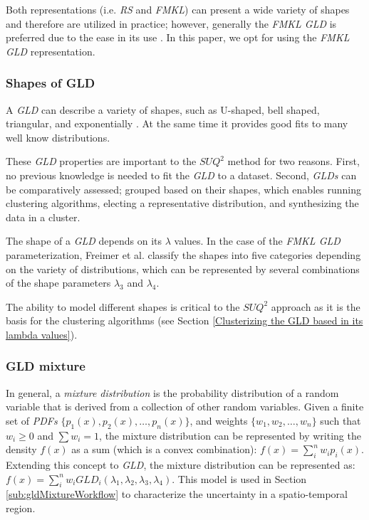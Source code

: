\documentclass[11pt]{article}
\begin{document}
Both representations (i.e. \textit{RS} and \textit{FMKL}) can present a wide variety of shapes and therefore are utilized in practice; however, generally the \textit{FMKL GLD} is preferred due to the ease in its use \cite{Corlu2016}. In this paper, we opt for using the \textit{FMKL GLD} representation.


\subsubsection{Shapes of GLD}
\label{gldShape}
A \textit{GLD} can describe a variety of shapes, such as U-shaped, bell shaped, triangular, and exponentially \cite{Su2007}. At the same time it provides good fits to many well know distributions. 

These \textit{GLD} properties are important to the  $SUQ^2$ method for two reasons. First, no previous knowledge is needed to fit the \textit{GLD} to a dataset. Second, \textit{GLDs} can be comparatively assessed; grouped based on their shapes, which enables running clustering algorithms, electing a representative distribution, and synthesizing the data in a cluster.

The shape of a \textit{GLD} depends on its $\lambda$ values. In the case of the \textit{FMKL GLD} parameterization, Freimer et al. \cite{Freimer1988} classify the shapes into five categories depending on the variety of distributions, which can be represented by several combinations of the shape parameters $\lambda_{3}$ and $\lambda_{4}$. 

The ability to model different shapes is critical to the $SUQ^2$ approach as it is the basis for the clustering algorithms (see Section \ref{Clusterizing the GLD based in its lambda values}).

\subsubsection{GLD mixture}
\label{GLDMixture}
In general, a \textit{mixture distribution} is the probability distribution of a random variable that is derived from a collection of other random variables. Given a finite set of \textit{PDFs} $\{p_{1}(x),p_{2}(x),\ldots,p_{n}(x)\}$, and weights $\{w_{1},w_{2},\ldots,w_{n}\}$ such that $w_{i} \geq 0$ and $\sum w_{i}=1$, the mixture distribution can be represented by writing the density $f(x)$ as a sum (which is a convex combination): $f(x)=\sum_{i}^n w_{i}p_{i}(x)$. Extending this concept to \textit{GLD}, the mixture distribution can be represented as:
$f(x)=\sum_{i}^n w_{i}GLD_{i}(\lambda_{1},\lambda_{2},\lambda_{3},\lambda_{4})$. This model is used in Section \ref{sub:gldMixtureWorkflow} to characterize the uncertainty in a spatio-temporal region.
\end{document}
